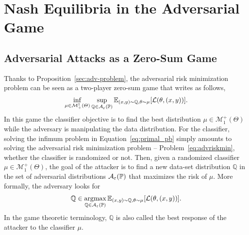 

\section{Nash Equilibria in the Adversarial Game}
\label{sec:nash-eq}

\subsection{Adversarial Attacks as a Zero-Sum Game}

Thanks to Proposition~\ref{sec:adv-problem}, the adversarial risk minimization problem can  be seen as a two-player zero-sum game that writes as follows,
\begin{align}
    \inf_{\mu\in\mathcal{M}^1_+(\Theta)} \sup_{\QQ\in\mathcal{A}_{\varepsilon}(\PP)}\mathbb{E}_{(x,y)\sim\QQ,\theta\sim\mu}\left[\loss(\theta,(x,y))\right].
\label{eq:primal_pb}
\end{align}
In this game the classifier objective is to find the best distribution $\mu \in \mathcal{M}_1^+(\Theta)$ while the adversary is manipulating the data distribution. For the classifier, solving the infimum problem in Equation~\eqref{eq:primal_pb} simply amounts to solving the adversarial risk minimization problem -- Problem~\eqref{eq:advriskmin}, whether the classifier is randomized or not. Then, given a randomized classifier $\mu \in \mathcal{M}_1^+(\Theta)$, the goal of the attacker is to find a new data-set distribution $\mathbb{Q}$ in the set of adversarial distributions $\mathcal{A}_{\varepsilon}(\mathbb{P})$ that maximizes the risk of $\mu$. More formally, the adversary looks for $$\mathbb{Q} \in \argmaxB_{\QQ\in\mathcal{A}_{\varepsilon}(\PP)} \mathbb{E}_{(x,y)\sim\QQ,\theta\sim\mu}\left[\loss(\theta,(x,y))\right]. $$
In the game theoretic terminology, $\mathbb{Q}$ is also called the best response of the attacker to the classifier $\mu$.

